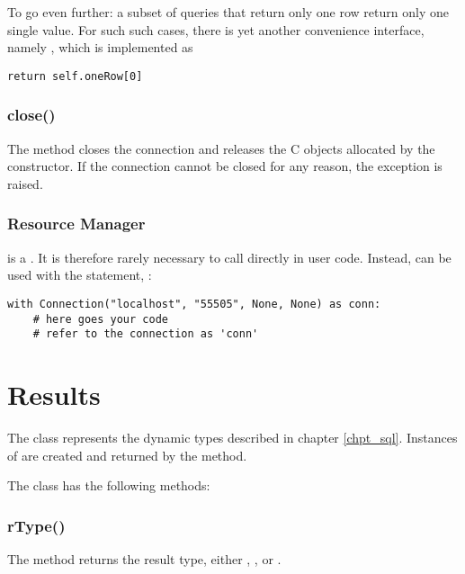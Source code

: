 To go even further: a subset of queries that return only
one row return only one single value. For such such cases,
there is yet another convenience interface, namely ,
which is implemented as

\begin{python}
\begin{lstlisting}
return self.oneRow[0]
\end{lstlisting}
\end{python}

\subsubsection{close()}
The method closes the connection and
releases the C objects allocated by
the constructor. If the connection
cannot be closed for any reason,
the exception  is raised.

\subsubsection{Resource Manager}
 is a .
It is therefore rarely necessary to call
 directly in user code.
Instead,  can
be used with the  statement, \ie:

\begin{python}
\begin{lstlisting}
with Connection("localhost", "55505", None, None) as conn:
    # here goes your code
    # refer to the connection as 'conn'
\end{lstlisting}
\end{python}

\section{Results}
The  class represents
the dynamic types described in chapter \ref{chpt_sql}.
Instances of  are
created and returned by
the  method.

The  class has the following methods:

\subsubsection{rType()}
The method returns the result type,
either , ,
 or .

